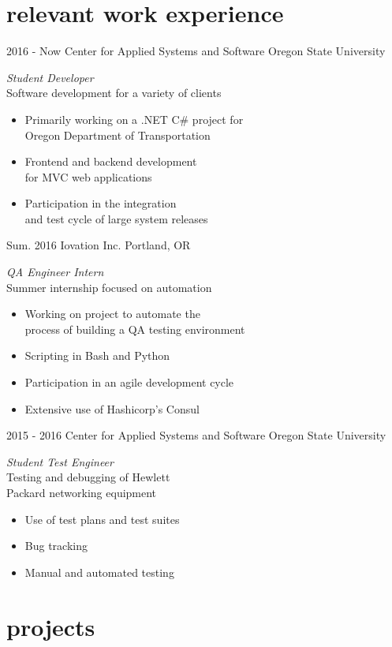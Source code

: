 \documentclass[1]{friggeri-cv} %
\begin{document}
\section{relevant work experience}
\begin{entrylist}
\entry
{2016 - Now}
{Center for Applied Systems and Software}
{Oregon State University}
{\emph{Student Developer}\hfill \\
Software development for a variety of clients
\begin{itemize}
\item Primarily working on a .NET C\# project for \\
Oregon Department of Transportation
\item Frontend and backend development \\ for MVC web applications
\item Participation in the integration \\ and test cycle of large system releases
\end{itemize}}
\entry
{Sum. 2016}
{Iovation Inc.}
{Portland, OR}
{\emph{QA Engineer Intern}\hfill \\
Summer internship focused on automation
\begin{itemize}
\item Working on project to automate the \\ process of building a QA testing environment
\item Scripting in Bash and Python
\item Participation in an agile development cycle
\item Extensive use of Hashicorp's Consul
\end{itemize}}
\entry
{2015 - 2016}
{Center for Applied Systems and Software}
{Oregon State University}
{\emph{Student Test Engineer}\hfill \\
Testing and debugging of Hewlett \\Packard networking equipment
\begin{itemize}
\item Use of test plans and test suites
\item Bug tracking
\item Manual and automated testing
\end{itemize}}
\end{entrylist}
\section{projects}
\end{document}
